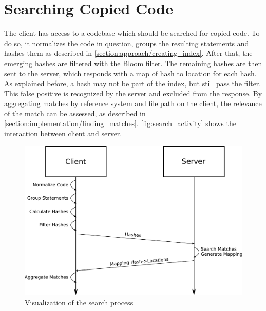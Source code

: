\section{Searching Copied Code}\label{section:approach/searching_copied_code}
The client has access to a codebase which should be searched for copied code.
To do so, it normalizes the code in question, groups the resulting statements and hashes them as described in \autoref{section:approach/creating_index}.
After that, the emerging hashes are filtered with the Bloom filter.
The remaining hashes are then sent to the server, which responds with a map of hash to location for each hash.
As explained before, a hash may not be part of the index, but still pass the filter.
This false positive is recognized by the server and excluded from the response.
By aggregating matches by reference system and file path on the client, the relevance of the match can be assessed, as described in \autoref{section:implementation/finding_matches}.
\autoref{fig:search_activity} shows the interaction between client and server.
\begin{figure}[h]
	\centering
	\includegraphics[width=\linewidth]{figures/searching_copied_code.pdf}
	\caption{Visualization of the search process}\label{fig:search_activity}
\end{figure}